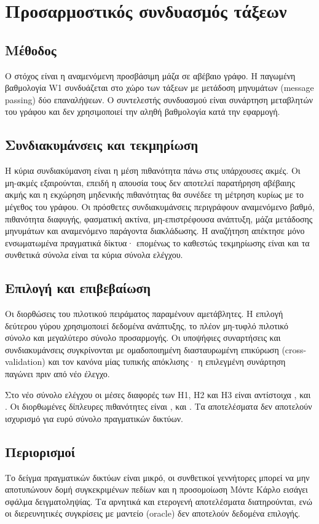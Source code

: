 \documentclass{article}
\begin{document}
\section*{Προσαρμοστικός συνδυασμός τάξεων}
\subsection*{Μέθοδος}
Ο στόχος είναι η αναμενόμενη προσβάσιμη μάζα σε αβέβαιο γράφο. Η παγωμένη
βαθμολογία W1 συνδυάζεται στο χώρο των τάξεων με μετάδοση μηνυμάτων
(message passing) δύο επαναλήψεων. Ο συντελεστής συνδυασμού είναι συνάρτηση
μεταβλητών του γράφου και δεν χρησιμοποιεί την αληθή βαθμολογία κατά την
εφαρμογή.

\subsection*{Συνδιακυμάνσεις και τεκμηρίωση}
Η κύρια συνδιακύμανση είναι η μέση πιθανότητα πάνω στις υπάρχουσες ακμές.
Οι μη-ακμές εξαιρούνται, επειδή η απουσία τους δεν αποτελεί παρατήρηση
αβέβαιης ακμής και η εκχώρηση μηδενικής πιθανότητας θα συνέδεε τη μέτρηση
κυρίως με το μέγεθος του γράφου. Οι πρόσθετες συνδιακυμάνσεις περιγράφουν
αναμενόμενο βαθμό, πιθανότητα διαφυγής, φασματική ακτίνα, μη-επιστρέφουσα
ανάπτυξη, μάζα μετάδοσης μηνυμάτων και αναμενόμενο παράγοντα διακλάδωσης.
Η αναζήτηση απέκτησε μόνο \FusionRealNetworkCount{} ενσωματωμένα πραγματικά
δίκτυα· επομένως το καθεστώς τεκμηρίωσης είναι \FusionEvidenceMode{} και τα
συνθετικά σύνολα είναι τα κύρια σύνολα ελέγχου.

\subsection*{Επιλογή και επιβεβαίωση}
Οι διορθώσεις του πιλοτικού πειράματος παραμένουν αμετάβλητες. Η επιλογή
δεύτερου γύρου χρησιμοποιεί δεδομένα ανάπτυξης, το πλέον μη-τυφλό πιλοτικό
σύνολο και μεγαλύτερο σύνολο προσαρμογής. Οι υποψήφιες συναρτήσεις και
συνδιακυμάνσεις συγκρίνονται με ομαδοποιημένη διασταυρωμένη επικύρωση
(cross-validation) και τον κανόνα μίας τυπικής απόκλισης· η επιλεγμένη
συνάρτηση παγώνει πριν από νέο έλεγχο.

Στο νέο σύνολο ελέγχου οι μέσες διαφορές των H1, H2 και H3 είναι αντίστοιχα
\FusionHOneMean{}, \FusionHTwoMean{} και \FusionHThreeMean{}. Οι διορθωμένες
δίπλευρες πιθανότητες είναι \FusionHOneP{}, \FusionHTwoP{} και
\FusionHThreeP{}. Τα αποτελέσματα δεν αποτελούν ισχυρισμό για ευρύ σύνολο
πραγματικών δικτύων.

\subsection*{Περιορισμοί}
Το δείγμα πραγματικών δικτύων είναι μικρό, οι συνθετικοί γεννήτορες μπορεί να
μην αποτυπώνουν δομή συγκεκριμένων πεδίων και η προσομοίωση Μόντε Κάρλο
εισάγει σφάλμα δειγματοληψίας. Τα αρνητικά και ετερογενή αποτελέσματα
διατηρούνται, ενώ οι διερευνητικές συγκρίσεις με μαντείο (oracle) δεν
αποτελούν δεδομένα επιλογής.
\end{document}
